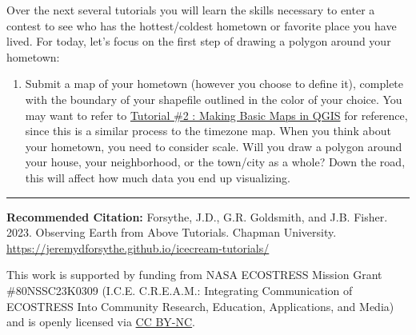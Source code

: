 \documentclass[oneside,a4paper,11pt,explicit]{book}
\begin{document}
	\begin{tcolorbox}[colback=yellow!5!white,colframe=IceCreamOrbit,title= \vspace{.2em} \Large Map of the Week Assignments]
		\large
            Over the next several tutorials you will learn the skills necessary to enter a contest to see who has the hottest/coldest hometown or favorite place you have lived. For today, let's focus on the first step of drawing a polygon around your hometown:
		\begin{enumerate}
			\item  Submit a map of your hometown (however you choose to define it), complete with the boundary of your shapefile outlined in the color of your choice. You may want to refer to \href{https://jeremydforsythe.github.io/icecream-tutorials/Tutorial2_MakingBasicMapsInQGIS/Tutorial2_MakingBasicMapsInQGIS.pdf}{Tutorial \#2 : Making Basic Maps in QGIS} for reference, since this is a similar process to the timezone map. When you think about your hometown, you need to consider scale. Will you draw a polygon around your house, your neighborhood, or the town/city as a whole? Down the road, this will affect how much data you end up visualizing. 
		\end{enumerate}
	\end{tcolorbox}
	
	\vfill
	
	\hrule
	
	\vspace{1em}
	
	\textbf{Recommended Citation:} Forsythe, J.D., G.R. Goldsmith, and J.B. Fisher. 2023. Observing Earth from Above Tutorials. Chapman University. \url{https://jeremydforsythe.github.io/icecream-tutorials/}
	
	\vspace{1em}
	
	This work is supported by funding from NASA ECOSTRESS Mission Grant \#80NSSC23K0309 (I.C.E. C.R.E.A.M.: Integrating Communication of ECOSTRESS Into Community Research, Education, Applications, and Media) and is openly licensed via \href{https://creativecommons.org/licenses/by-nc/4.0/}{CC BY-NC}.
	
\end{document}
